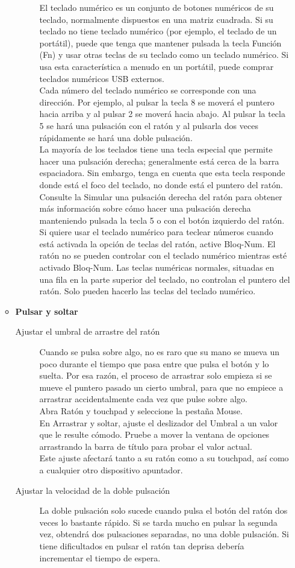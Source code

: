 \begin{itemize}
\begin{itemize}
\begin{description}
El teclado numérico es un conjunto de botones numéricos de su teclado, normalmente dispuestos en una matriz cuadrada. Si su teclado no tiene teclado numérico (por ejemplo, el teclado de un portátil), puede que tenga que mantener pulsada la tecla Función (Fn) y usar otras teclas de su teclado como un teclado numérico. Si usa esta característica a menudo en un portátil, puede comprar teclados numéricos USB externos.\\
Cada número del teclado numérico se corresponde con una dirección. Por ejemplo, al pulsar la tecla 8 se moverá el puntero hacia arriba y al pulsar 2 se moverá hacia abajo. Al pulsar la tecla 5 se hará una pulsación con el ratón y al pulsarla dos veces rápidamente se hará una doble pulsación.\\
La mayoría de los teclados tiene una tecla especial que permite hacer una pulsación derecha; generalmente está cerca de la barra espaciadora. Sin embargo, tenga en cuenta que esta tecla responde donde está el foco del teclado, no donde está el puntero del ratón. Consulte la Simular una pulsación derecha del ratón para obtener más información sobre cómo hacer una pulsación derecha manteniendo pulsada la tecla 5 o con el botón izquierdo del ratón.\\
Si quiere usar el teclado numérico para teclear números cuando está activada la opción de teclas del ratón, active Bloq-Num. El ratón no se pueden controlar con el teclado numérico mientras esté activado Bloq-Num.
Las teclas numéricas normales, situadas en una fila en la parte superior del teclado, no controlan el puntero del ratón. Solo pueden hacerlo las teclas del teclado numérico.
			\end{description}
		\item {\large \bf Pulsar y soltar}
			\begin{description}
				\item[Ajustar el umbral de arrastre del ratón] Cuando se pulsa sobre algo, no es raro que su mano se mueva un poco durante el tiempo que pasa entre que pulsa el botón y lo suelta. Por esa razón, el proceso de arrastrar solo empieza si se mueve el puntero pasado un cierto umbral, para que no empiece a arrastrar accidentalmente cada vez que pulse sobre algo.\\

Abra Ratón y touchpad y seleccione la pestaña Mouse.\\
En Arrastrar y soltar, ajuste el deslizador del Umbral a un valor que le resulte cómodo. Pruebe a mover la ventana de opciones arrastrando la barra de título para probar el valor actual.\\
Este ajuste afectará tanto a su ratón como a su touchpad, así como a cualquier otro dispositivo apuntador.
				\item[Ajustar la velocidad de la doble pulsación] La doble pulsación solo sucede cuando pulsa el botón del ratón dos veces lo bastante rápido. Si se tarda mucho en pulsar la segunda vez, obtendrá dos pulsaciones separadas, no una doble pulsación. Si tiene dificultados en pulsar el ratón tan deprisa debería incrementar el tiempo de espera.\\


\end{description}
\end{itemize}
\end{itemize}
